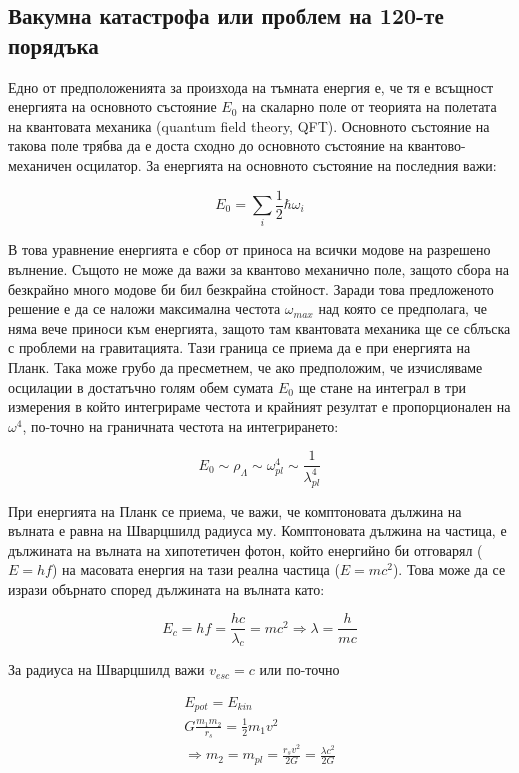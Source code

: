 \documentclass[a4paper,12pt]{article}
\begin{document}
\subsection{Вакумна катастрофа или проблем на 120-те порядъка}
Едно от предположенията за произхода на тъмната енергия е, че тя е всъщност енергията на основното състояние $E_0$ на скаларно поле от теорията на полетата на квантовата механика (quantum field theory, QFT). Основното състояние на такова поле трябва да е доста сходно до основното състояние на квантово-механичен осцилатор. За енергията на основното състояние на последния важи:

\begin{equation}
    E_0 = \sum_i \frac{1}{2} \hbar \omega_i
\end{equation}

В това уравнение енергията е сбор от приноса на всички модове на разрешено вълнение. Същото не може да важи за квантово механично поле, защото сбора на безкрайно много модове би бил безкрайна стойност. Заради това предложеното решение е да се наложи максимална честота $\omega_{max}$ над която се предполага, че няма вече приноси към енергията, защото там квантовата механика ще се сблъска с проблеми на гравитацията. Тази граница се приема да е при енергията на Планк. Така може грубо да пресметнем, че ако предположим, че изчисляваме осцилации в достатъчно голям обем сумата $E_0$ ще стане на интеграл в три измерения в който интегрираме честота и крайният резултат е пропорционален на $\omega^4$, по-точно на граничната честота на интегрирането:

\begin{equation}
    E_0 \sim \rho_\Lambda \sim \omega_{pl}^4 \sim \frac{1}{\lambda_{pl}^4}
\label{eq:e_vac}
\end{equation}

При енергията на Планк се приема, че важи, че комптоновата дължина на вълната е равна на Шварцшилд радиуса му. Комптоновата дължина на частица, е дължината на вълната на хипотетичен фотон, който енергийно би отговарял ($E=hf$) на масовата енергия на тази реална частица ($E=mc^2$). Това може да се изрази обърнато според дължината на вълната като:

\begin{equation}
    E_c = hf = \frac{hc}{\lambda_c} = mc^2 \Rightarrow \lambda = \frac{h}{mc}
\end{equation}

За радиуса на Шварцшилд важи $v_{esc}=c$ или по-точно

\begin{gather}
    E_{pot} = E_{kin}\\
    G\frac{m_1 m_2}{r_s} = \frac{1}{2}m_1 v^2\\
    \Rightarrow m_2=m_{pl}= \frac{r_s v^2}{2G} = \frac{\lambda c^2}{2G}
\end{gather}
\end{document}
